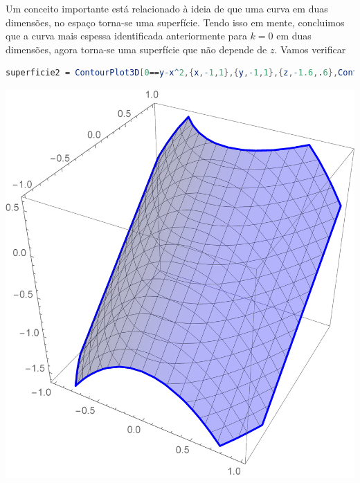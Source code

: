 \documentclass[a4paper, 12pt]{article}
\begin{document}
	Um conceito importante está relacionado à ideia de que uma curva em duas dimensões, no espaço torna-se uma superfície. Tendo isso em mente, concluimos que a curva mais espessa identificada anteriormente para $k=0$ em duas dimensões, agora torna-se uma superfície que não depende de $z$. Vamos verificar
	
\begin{lstlisting}[language=Mathematica]
superficie2 = ContourPlot3D[0==y-x^2,{x,-1,1},{y,-1,1},{z,-1.6,.6},ContourStyle->{Red,Opacity[0.3]},BoundaryStyle->{Thick,Red}]
\end{lstlisting}

\begin{minipage}{.5\linewidth}
	\includegraphics[scale=.25]{images/ContourPlot3d}
\end{minipage}
\end{document}
